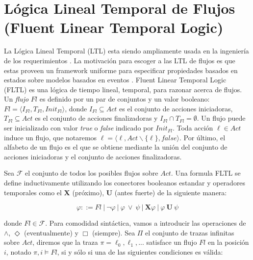 \section{Lógica Lineal Temporal de Flujos (Fluent Linear Temporal Logic)}
\label{LTL}

La Lógica Lineal Temporal (LTL) esta siendo ampliamente usada en la ingeniería de los requerimientos
\cite{1347546,Giannakopoulou:2003:FMC:940071.940106,879820,Letier:2002:ATG:581339.581353}. La motivación para escoger a
las LTL de flujos es que estas proveen un framework uniforme para especificar propiedades basados en estados sobre
modelos basados en eventos \cite{Giannakopoulou:2003:FMC:940071.940106}. Fluent Linear Temporal Logic (FLTL) \cite{Giannakopoulou:2003:FMC:940071.940106}
es una lógica de tiempo lineal, temporal, para razonar acerca de flujos. Un \emph{flujo} $Fl$ es definido por un par de
conjuntos y un valor booleano: $Fl = \langle I_{Fl},T_{Fl},Init_{Fl}\rangle$, donde $I_{Fl} \subseteq Act$ es el
conjunto de acciones iniciadoras, $T_{Fl} \subseteq Act$ es el conjunto de acciones finalizadoras y $I_{Fl} \cap T_{Fl}
= \emptyset$. Un flujo puede ser inicializado con valor \emph{true} o \emph{false} indicado por $Init_{Fl}$. Toda acción $\ell \in
Act$ induce un flujo, que notaremos $\ell = \langle\ell, Act \backslash \{\ell\}, false\rangle$. Por último, el alfabeto
de un flujo es el que se obtiene mediante la unión del conjunto de acciones iniciadoras y el conjunto de acciones
finalizadoras.

Sea $\mathcal{F}$ el conjunto de todos los posibles flujos sobre $Act$. Una formula FLTL se define inductivamente
utilizando los conectores booleanos estandar y operadores temporales como el $\mathbf{X}$ (próximo), $\mathbf{U}$ (antes
fuerte) de la siguiente manera:

\begin{center}
\begin{equation}
    \varphi ::= Fl\ |\ \neg\varphi\ |\ \varphi\ \lor\ \psi\ |\ \mathbf{X} \varphi\ |\ \varphi\ \mathbf{U}\ \psi
\end{equation}
\end{center}

\noindent donde $Fl \in \mathcal{F}$. Para comodidad sintáctica, vamos a introducir las operaciones de $\land$,
$\Diamond$ (eventualmente) y $\Box$ (siempre). Sea $\Pi$ el conjunto de trazas infinitas sobre $Act$, diremos que la
traza $\pi = \ell_0,\ell_1,...$ satisface un flujo $Fl$ en la posición $i$, notado $\pi,i\vDash Fl$, si y sólo si una de
las siguientes condiciones es válida:

